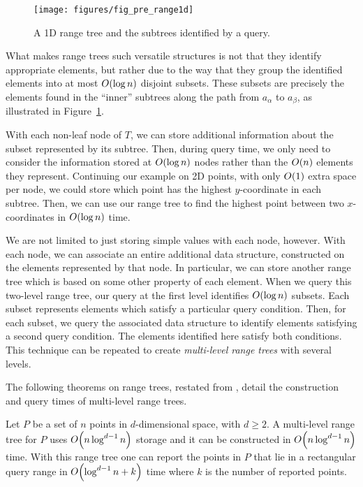 \begin{figure}
\begin{center}
  \texttt{[image: figures/fig\_pre\_range1d]}
  \caption{A 1D range tree and the subtrees identified by a query.}
  \label{fig:pre:range1d}
\end{center}
\end{figure}

What makes range trees such versatile structures is not that they identify appropriate elements, but rather due to the way that they group the identified elements into at most $O\!\left(\log{n}\right)$ disjoint subsets.
These subsets are precisely the elements found in the ``inner'' subtrees along the path from $a_\alpha$ to $a_\beta$, as illustrated in Figure~\ref{fig:pre:range1d}.

With each non-leaf node of $T$, we can store additional information about the subset represented by its subtree.  Then, during query time, we only need to consider the information stored at $O\!\left(\log{n}\right)$ nodes rather than the $O\!\left(n\right)$ elements they represent. Continuing our example on 2D points, with only $O\!\left(1\right)$ extra space per node, we could store which point has the highest $y$-coordinate in each subtree.  Then, we can use our range tree to find the highest point between two $x$-coordinates in $O\!\left(\log{n}\right)$ time.

We are not limited to just storing simple values with each node, however.
With each node, we can associate an entire additional data structure, constructed on the elements represented by that node.
In particular, we can store another range tree which is based on some other property of each element.
When we query this two-level range tree, our query at the first level identifies $O\!\left(\log{n}\right)$ subsets.
Each subset represents elements which satisfy a particular query condition.
Then, for each subset, we query the associated data structure to identify elements satisfying a second query condition.
The elements identified here satisfy both conditions.
This technique can be repeated to create \emph{multi-level range trees} with several levels.

The following theorems on range trees, restated from \cite{debergch5}, detail the construction and query times of multi-level range trees.

\begin{theorem}
\label{th:rangetree}
Let $P$ be a set of $n$ points in $d$-dimensional space, with $d \geq 2$. A multi-level range tree for $P$ uses $O\!\left(n \log^{d-1}{n}\right)$ storage and it can be constructed in $O\!\left(n \log^{d-1}{n}\right)$ time. With this range tree one can report the points in $P$ that lie in a rectangular query range in $O\!\left(\log^{d-1}{n} + k\right)$ time where $k$ is the number of reported points.
\end{theorem}

